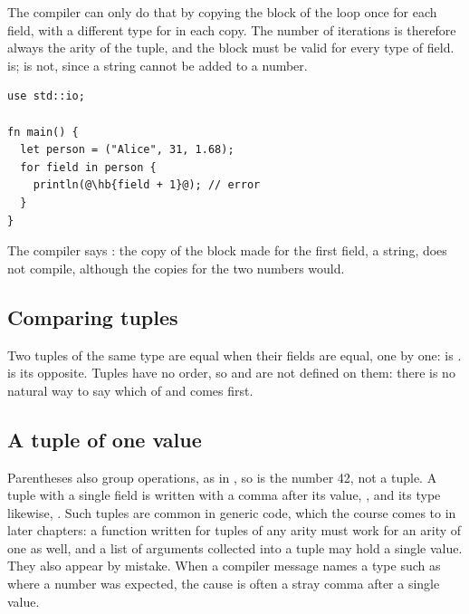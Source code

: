 The compiler can only do that by copying the block of the loop once for each
field, with a different type for  in each copy. The number of
iterations is therefore always the arity of the tuple, and the block must be
valid for every type of field.  is;  is not,
since a string cannot be added to a number.

\begin{lstlisting}[style=coloredverbatimError, escapechar=@, caption=A block that is not valid for every field]
use std::io;

fn main() {
  let person = ("Alice", 31, 1.68);
  for field in person {
    println(@\hb{field + 1}@); // error
  }
}
\end{lstlisting}

The compiler says :
the copy of the block made for the first field, a string, does not compile,
although the copies for the two numbers would.

\subsection{Comparing tuples}

Two tuples of the same type are equal when their fields are equal, one by one:
 is . \token{!=} is its opposite.
Tuples have no order, so \token{<} and \token{>} are not defined on them: there
is no natural way to say which of  and  comes first.

\subsection{A tuple of one value}

Parentheses also group operations, as in , so 
is the number 42, not a tuple. A tuple with a single field is written with a
comma after its value, , and its type likewise, .
Such tuples are common in generic code, which the course comes to in later
chapters: a function written for tuples of any arity must work for an arity of
one as well, and a list of arguments collected into a tuple may hold a single
value. They also appear by mistake. When a compiler message names a type such as
 where a number was expected, the cause is often a stray comma
after a single value.
